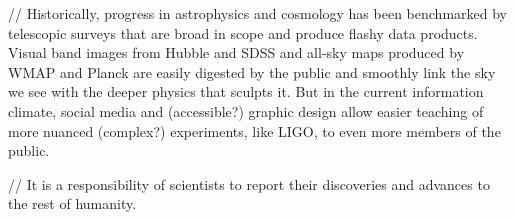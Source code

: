 // Historically, progress in astrophysics and cosmology has been benchmarked by telescopic surveys that are broad in scope and produce flashy data products. Visual band images from Hubble and SDSS and all-sky maps produced by WMAP and Planck are easily digested by the public and smoothly link the sky we see with the deeper physics that sculpts it. But in the current information climate, social media and (accessible?) graphic design allow easier teaching of more nuanced (complex?) experiments, like LIGO, to even more members of the public.

// It is a responsibility of scientists to report their discoveries and advances to the rest of humanity. 


